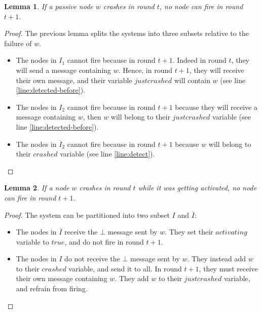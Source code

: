 \documentclass{article}
\newtheorem{lemma}{Lemma}
\begin{document}
\begin{lemma} \label{lem:no-fire}
	If a passive node $w$ crashes in round $t$, no node can fire in round $t+1$.
\end{lemma}
\begin{proof}
	The previous lemma splits the systems into three subsets relative to the failure of $w$.
	\begin{itemize}
		\item The nodes in $I_1$ cannot fire because in round $t+1$. Indeed in round $t$, they will send a message containing $w$.
			Hence, in round $t+1$, they will receive their own message, and their variable $justcrashed$ will contain $w$ (see line \ref{line:detected-before}).
		\item The nodes in $I_2$ cannot fire because in round $t+1$ because they will receive a message containing $w$,
			then $w$ will belong to their $justcrashed$ variable (see line \ref{line:detected-before}).
		\item The nodes in $\overline{I}_2$ cannot fire because in round $t+1$ because $w$ will belong to their $crashed$ variable (see line \ref{line:detect}).
	\end{itemize}
\end{proof}

\begin{lemma} \label{lem:no-fire-activating}
	If a node $w$ crashes in round $t$ while it was getting activated, no node can fire in round $t+1$.
\end{lemma}
\begin{proof}
	The system can be partitioned into two subset $I$ and $\overline{I}$:
	\begin{itemize}
		\item The nodes in $\overline{I}$ receive the $\bot$ message sent by $w$. They set their $activating$ variable to $true$, and do not fire in round $t+1$.
		\item The nodes in $I$ do not receive the $\bot$ message sent by $w$. They instead add $w$ to their $crashed$ variable, and send it to all.
			In round $t+1$, they must receive their own message containing $w$. They add $w$ to their $justcrashed$ variable, and refrain from firing.
	\end{itemize}
\end{proof}
\end{document}
